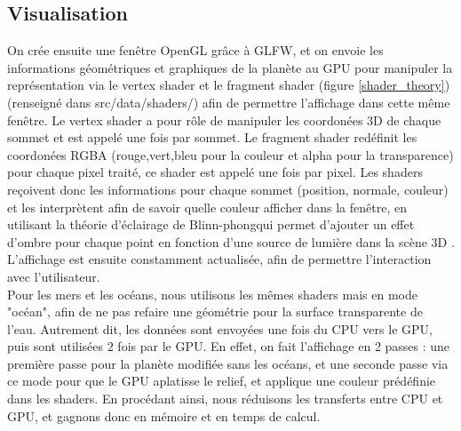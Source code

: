 \documentclass[a4paper]{article}
\begin{document}
\subsection{Visualisation}

On crée ensuite une fenêtre OpenGL grâce à GLFW, et on envoie les informations géométriques et graphiques de la planète au GPU pour manipuler la représentation via le vertex shader et le fragment shader (figure \ref{shader_theory})(renseigné dans src/data/shaders/) afin de permettre l'affichage dans cette même fenêtre. Le vertex shader a pour rôle de manipuler les coordonées 3D de chaque sommet et est appelé une fois par sommet. Le fragment shader redéfinit les coordonées RGBA (rouge,vert,bleu pour la couleur et alpha pour la transparence) pour chaque pixel traité, ce shader est appelé une fois par pixel. Les shaders reçoivent donc les informations pour chaque sommet (position, normale, couleur) et les interprètent afin de savoir quelle couleur afficher dans la fenêtre, en utilisant la théorie d'éclairage de Blinn-phong\protect\footnotemark  qui permet d'ajouter un effet d'ombre pour chaque point en fonction d'une source de lumière dans la scène 3D \cite{BlinnPhong}. L'affichage est ensuite constamment actualisée, afin de permettre l'interaction avec l'utilisateur.\\
Pour les mers et les océans, nous utilisons les mêmes shaders mais en mode "océan", afin de ne pas refaire une géométrie pour la surface transparente de l'eau. Autrement dit, les données sont envoyées une fois du CPU vers le GPU, puis sont utilisées 2 fois par le GPU. En effet, on fait l'affichage en 2 passes : une première passe pour la planète modifiée sans les océans, et une seconde passe via ce mode pour que le GPU aplatisse le relief, et applique une couleur prédéfinie dans les shaders. En procédant ainsi, nous réduisons les transferts entre CPU et GPU, et gagnons donc en mémoire et en temps de calcul.

\end{document}
